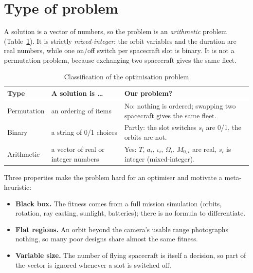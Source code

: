 \section{Type of problem}
A solution is a vector of numbers, so the problem is an \emph{arithmetic} problem
(Table~\ref{tab:ptype}). It is strictly \emph{mixed-integer}: the orbit variables and the
duration are real numbers, while one on/off switch per spacecraft slot is binary. It is not a
permutation problem, because exchanging two spacecraft gives the same fleet.

\begin{table}[htbp]
\centering
\caption{Classification of the optimisation problem}
\label{tab:ptype}
\footnotesize
\begin{tabularx}{\textwidth}{@{}p{2.0cm}p{3.6cm}X@{}}
\toprule
Type & A solution is \dots & Our problem? \\
\midrule
Permutation & an ordering of items & No: nothing is ordered; swapping two spacecraft gives the same fleet. \\
Binary & a string of 0/1 choices & Partly: the slot switches $s_i$ are 0/1, the orbits are not. \\
Arithmetic & a vector of real or integer numbers & Yes: $T$, $a_i$, $\iota_i$, $\Omega_i$, $M_{0,i}$ are real, $s_i$ is integer (mixed-integer). \\
\bottomrule
\end{tabularx}
\end{table}

Three properties make the problem hard for an optimiser and motivate a meta-heuristic:
\begin{itemize}
\item \textbf{Black box.} The fitness comes from a full mission simulation (orbits, rotation,
ray casting, sunlight, batteries); there is no formula to differentiate.
\item \textbf{Flat regions.} An orbit beyond the camera's usable range photographs nothing,
so many poor designs share almost the same fitness.
\item \textbf{Variable size.} The number of flying spacecraft is itself a decision, so part of
the vector is ignored whenever a slot is switched off.
\end{itemize}


